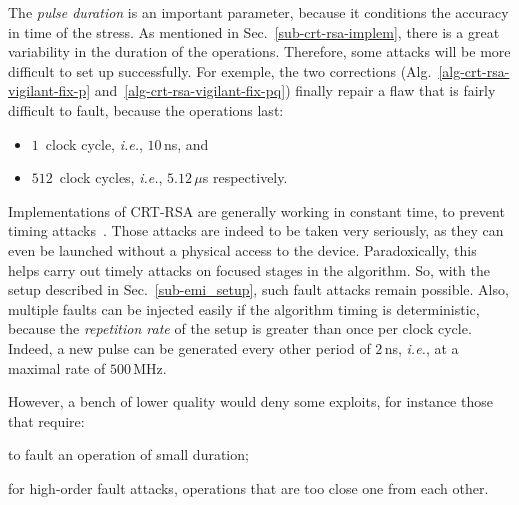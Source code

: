 \documentclass[10pt]{article}
\theoremstyle{definition}
\theoremstyle{theorem}
\newcommand{\ie}{\textit{i.e.}}
\begin{document}
The \emph{pulse duration} is an important parameter, because it conditions the accuracy in time of the stress.
As mentioned in Sec.~\ref{sub-crt-rsa-implem}, there is a great variability in the duration of the operations.
Therefore, some attacks will be more difficult to set up successfully.
For exemple, the two corrections (Alg.~\ref{alg-crt-rsa-vigilant-fix-p} and~\ref{alg-crt-rsa-vigilant-fix-pq}) finally repair a flaw that is fairly difficult to fault,
because the operations last:
\begin{itemize}
\item $1$~clock cycle, \ie, $10$\,ns, and
\item $512$~clock cycles, \ie, $5.12$\,$\mu$s respectively.
\end{itemize}

Implementations of CRT-RSA are generally working in constant time, to prevent timing attacks~\cite{kocher-timing_attacks}.
Those attacks are indeed to be taken very seriously, as they can even be launched without a physical access to the device.
Paradoxically, this helps carry out timely attacks on focused stages in the algorithm.
So, with the setup described in Sec.~\ref{sub-emi_setup}, such fault attacks remain possible.
Also, multiple faults can be injected easily if the algorithm timing is deterministic,
because the \emph{repetition rate} of the setup is greater than once per clock cycle.
Indeed, a new pulse can be generated every other period of $2$\,ns, \ie, at a maximal rate of $500$\,MHz.

However, a bench of lower quality would deny some exploits, for instance those that require:
\begin{inparaenum}
\item to fault an operation of small duration;
\item for high-order fault attacks, operations that are too close one from each other.
\end{inparaenum}
\end{document}
